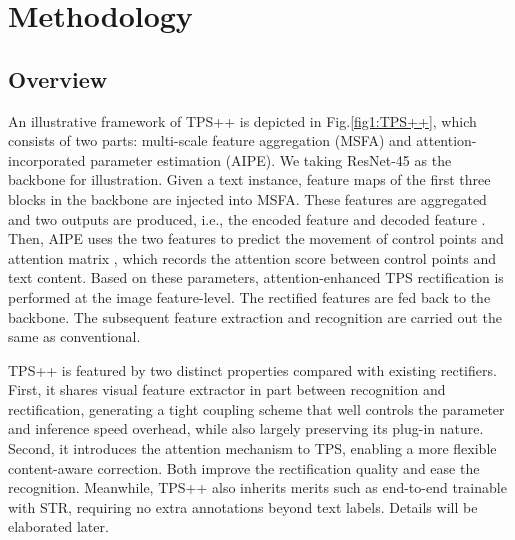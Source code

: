 \documentclass{article}
\begin{document}
\section{Methodology}
\subsection{Overview}
An illustrative framework of TPS++ is depicted in Fig.\ref{fig1:TPS++}, which consists of two parts: multi-scale feature aggregation (MSFA) and attention-incorporated parameter estimation (AIPE). We taking ResNet-45 as the backbone for illustration. Given a text instance, feature maps of the first three blocks in the backbone are injected into MSFA. These features are aggregated and two outputs are produced, i.e., the encoded feature  and decoded feature . Then, AIPE uses the two features to predict the movement of control points and attention matrix , which records the attention score between control points and text content. Based on these parameters, attention-enhanced TPS rectification is performed at the image feature-level. The rectified features are fed back to the backbone. The subsequent feature extraction and recognition are carried out the same as conventional. 

TPS++ is featured by two distinct properties compared with existing rectifiers. First, it shares visual feature extractor in part between recognition and rectification, generating a tight coupling scheme that well controls the parameter and inference speed overhead, while also largely preserving its plug-in nature. Second, it introduces the attention mechanism to TPS, enabling a more flexible content-aware correction. Both improve the rectification quality and ease the recognition. Meanwhile, TPS++ also inherits merits such as end-to-end trainable with STR, requiring no extra annotations beyond text labels. Details will be elaborated later.
\end{document}
